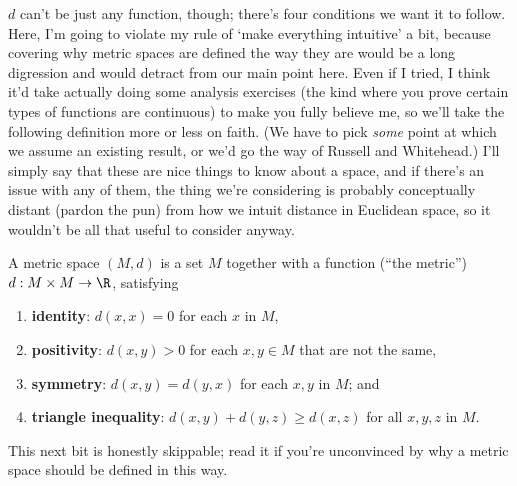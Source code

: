 \documentclass{lec}
\begin{document}
    $d$ can't be just any function, though; there's four conditions we want it to follow. Here, I'm going to violate my rule of `make everything intuitive' a bit, because covering why metric spaces are defined the way they are would be a long digression and would detract from our main point here. Even if I tried, I think it'd take actually doing some analysis exercises (the kind where you prove certain types of functions are continuous) to make you fully believe me, so we'll take the following definition more or less on faith. (We have to pick \textit{some} point at which we assume an existing result, or we'd go the way of Russell and Whitehead.) I'll simply say that these are nice things to know about a space, and if there's an issue with any of them, the thing we're considering is probably conceptually distant (pardon the pun) from how we intuit distance in Euclidean space, so it wouldn't be all that useful to consider anyway.

    \begin{definition}
        A metric space $(M, d)$ is a set $M$ together with a function (``the metric'') $d: M \times M \to \R$, satisfying

        \begin{enumerate}
            \item \textbf{identity}: $d(x, x) = 0$ for each $x$ in $M$,
            \item \textbf{positivity}: $d(x, y) > 0$ for each $x, y \in M$ that are not the same,
            \item \textbf{symmetry}: $d(x, y) = d(y, x)$ for each $x, y$ in $M$; and
            \item \textbf{triangle inequality}: $d(x, y) + d(y, z) \geq d(x, z)$ for all $x, y, z$ in $M$.
        \end{enumerate}
    \end{definition}

    This next bit is honestly skippable; read it if you're unconvinced by why a metric space should be defined in this way.
\end{document}
